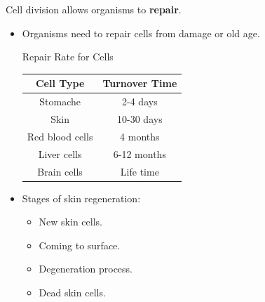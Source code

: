 \documentclass[12pt]{report}
\begin{document}
Cell division allows organisms to \textbf{repair}.
\begin{itemize}
    \item{Organisms need to repair cells from damage or old age.}
    \begin{table}[h!] %
    
        \renewcommand{\arraystretch}{1.5} %
        \setlength{\tabcolsep}{10pt} %
        \setlength{\arrayrulewidth}{0.25mm}
    
        \begin{center}
            Repair Rate for Cells \\
            \vspace{0.5em}
            \begin{tabular}{|c|c|} %
            \hline
            Cell Type & Turnover Time \\ %
            \hline
            Stomache &  2-4 days\\ %
            \hline
            Skin & 10-30 days\\ 
            \hline
            Red blood cells & 4 months \\ 
            \hline 
            Liver cells & 6-12 months\\ 
            \hline 
            Brain cells & Life time\\ 
            \hline
            \end{tabular}
        \end{center}
    \end{table}

    \item{Stages of skin regeneration:}
        \begin{itemize}
            \item{New skin cells.}
            \item{Coming to surface.}
            \item{Degeneration process.}
            \item{Dead skin cells.}
        \end{itemize}
\end{itemize}
\end{document}
